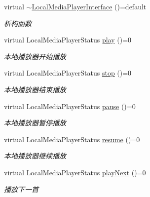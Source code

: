 \begin{DoxyCompactItemize}
\item 
\mbox{\label{classduerOSDcsSDK_1_1sdkInterfaces_1_1LocalMediaPlayerInterface_af9761f288afcba9866dad714e690501b}} 
virtual \hyperlink{classduerOSDcsSDK_1_1sdkInterfaces_1_1LocalMediaPlayerInterface_af9761f288afcba9866dad714e690501b}{$\sim$\+Local\+Media\+Player\+Interface} ()=default
\begin{DoxyCompactList}\small\item\em 析构函数 \end{DoxyCompactList}\item 
virtual Local\+Media\+Player\+Status \hyperlink{classduerOSDcsSDK_1_1sdkInterfaces_1_1LocalMediaPlayerInterface_aab502afd0db0728b813a8b85d915c1c5}{play} ()=0
\begin{DoxyCompactList}\small\item\em 本地播放器开始播放 \end{DoxyCompactList}\item 
virtual Local\+Media\+Player\+Status \hyperlink{classduerOSDcsSDK_1_1sdkInterfaces_1_1LocalMediaPlayerInterface_a562eaa0a0448c10031296f72c1362ec6}{stop} ()=0
\begin{DoxyCompactList}\small\item\em 本地播放器结束播放 \end{DoxyCompactList}\item 
virtual Local\+Media\+Player\+Status \hyperlink{classduerOSDcsSDK_1_1sdkInterfaces_1_1LocalMediaPlayerInterface_ac134ae6ae0862f930c7eb728ae58706a}{pause} ()=0
\begin{DoxyCompactList}\small\item\em 本地播放器暂停播放 \end{DoxyCompactList}\item 
virtual Local\+Media\+Player\+Status \hyperlink{classduerOSDcsSDK_1_1sdkInterfaces_1_1LocalMediaPlayerInterface_a960a77263704220915e58df376e72498}{resume} ()=0
\begin{DoxyCompactList}\small\item\em 本地播放器继续播放 \end{DoxyCompactList}\item 
virtual Local\+Media\+Player\+Status \hyperlink{classduerOSDcsSDK_1_1sdkInterfaces_1_1LocalMediaPlayerInterface_a539d83dcddade8c758371b708bd03dad}{play\+Next} ()=0
\begin{DoxyCompactList}\small\item\em 播放下一首 \end{DoxyCompactList}\item 

\end{DoxyCompactItemize}
